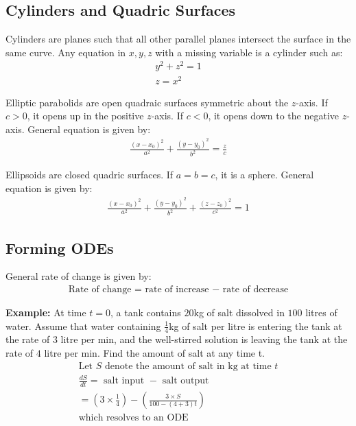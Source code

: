 \documentclass[12pt, a4paper]{article}
\begin{document}
\begin{multicols*}{3}
\subsection{Cylinders and Quadric Surfaces}
Cylinders are planes such that all other parallel planes intersect the surface in the same curve. Any equation in $x,y,z$ with a missing variable is a cylinder such as:
\begin{align*}
  y^2+z^2=1\\
  z=x^2
\end{align*}

Elliptic parabolids are open quadraic surfaces symmetric about the $z$-axis. If $c > 0$, it opens up in the positive $z$-axis. If $c < 0$, it opens down to the negative $z$-axis. General equation is given by:
\begin{align*}
  \frac{(x-x_0)^2}{a^2}+\frac{(y-y_0)^2}{b^2}=\frac{z}{c}
\end{align*}

Ellipsoids are closed quadric surfaces. If $a=b=c$, it is a sphere. General equation is given by:
\begin{align*}
  \frac{(x-x_0)^2}{a^2}+\frac{(y-y_0)^2}{b^2} + \frac{(z-z_0)^2}{c^2} = 1
\end{align*}

\begin{center}
\end{center}

\colbreak
\subsection{Forming ODEs}
General rate of change is given by:
\begin{align*}
  \text{Rate of change = rate of increase }-\text{ rate of decrease}
\end{align*}

\textbf{Example: }At time $t = 0$, a tank contains $20$kg of salt dissolved in $100$ litres of water.
Assume that water containing $\frac{1}{4}$kg of salt per litre is entering the tank at the rate of $3$ litre per
min, and the well-stirred solution is leaving the tank at the rate of $4$ litre per min. Find the amount of salt at
any time t.
\begin{gather*}
  \text{Let $S$ denote the amount of salt in kg at time $t$}\\
  \frac{dS}{dt} = \text{ salt input } - \text{ salt output}\\= (3 \times \frac{1}{4}) - (\frac{3 \times S}{100 - (4 + 3)t})\\
  \text{which resolves to an ODE}
\end{gather*}


\end{multicols*}
\end{document}
